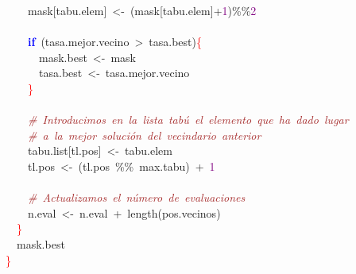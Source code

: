 \mbox{}\ \ \ \ mask\textcolor{BrickRed}{[}tabu\textcolor{BrickRed}{.}elem\textcolor{BrickRed}{]}\ \textcolor{BrickRed}{\textless{}-}\ \textcolor{BrickRed}{(}mask\textcolor{BrickRed}{[}tabu\textcolor{BrickRed}{.}elem\textcolor{BrickRed}{]+}\textcolor{Purple}{1}\textcolor{BrickRed}{)\%\%}\textcolor{Purple}{2} \\
\mbox{}\ \ \ \  \\
\mbox{}\ \ \ \ \textbf{\textcolor{Blue}{if}}\ \textcolor{BrickRed}{(}tasa\textcolor{BrickRed}{.}mejor\textcolor{BrickRed}{.}vecino\ \textcolor{BrickRed}{\textgreater{}}\ tasa\textcolor{BrickRed}{.}best\textcolor{BrickRed}{)}\textcolor{Red}{\{} \\
\mbox{}\ \ \ \ \ \ mask\textcolor{BrickRed}{.}best\ \textcolor{BrickRed}{\textless{}-}\ mask \\
\mbox{}\ \ \ \ \ \ tasa\textcolor{BrickRed}{.}best\ \textcolor{BrickRed}{\textless{}-}\ tasa\textcolor{BrickRed}{.}mejor\textcolor{BrickRed}{.}vecino \\
\mbox{}\ \ \ \ \textcolor{Red}{\}} \\
\mbox{}\ \ \ \  \\
\mbox{}\ \ \ \ \textit{\textcolor{Brown}{\#\ Introducimos\ en\ la\ lista\ tabú\ el\ elemento\ que\ ha\ dado\ lugar}} \\
\mbox{}\ \ \ \ \textit{\textcolor{Brown}{\#\ a\ la\ mejor\ solución\ del\ vecindario\ anterior}} \\
\mbox{}\ \ \ \ tabu\textcolor{BrickRed}{.}list\textcolor{BrickRed}{[}tl\textcolor{BrickRed}{.}pos\textcolor{BrickRed}{]}\ \textcolor{BrickRed}{\textless{}-}\ tabu\textcolor{BrickRed}{.}elem \\
\mbox{}\ \ \ \ tl\textcolor{BrickRed}{.}pos\ \textcolor{BrickRed}{\textless{}-}\ \textcolor{BrickRed}{(}tl\textcolor{BrickRed}{.}pos\ \textcolor{BrickRed}{\%\%}\ max\textcolor{BrickRed}{.}tabu\textcolor{BrickRed}{)}\ \textcolor{BrickRed}{+}\ \textcolor{Purple}{1} \\
\mbox{}\ \ \ \  \\
\mbox{}\ \ \ \ \textit{\textcolor{Brown}{\#\ Actualizamos\ el\ número\ de\ evaluaciones}} \\
\mbox{}\ \ \ \ n\textcolor{BrickRed}{.}eval\ \textcolor{BrickRed}{\textless{}-}\ n\textcolor{BrickRed}{.}eval\ \textcolor{BrickRed}{+}\ length\textcolor{BrickRed}{(}pos\textcolor{BrickRed}{.}vecinos\textcolor{BrickRed}{)} \\
\mbox{}\ \ \textcolor{Red}{\}} \\
\mbox{}\ \ mask\textcolor{BrickRed}{.}best \\
\mbox{}\textcolor{Red}{\}} \\
\mbox{}
